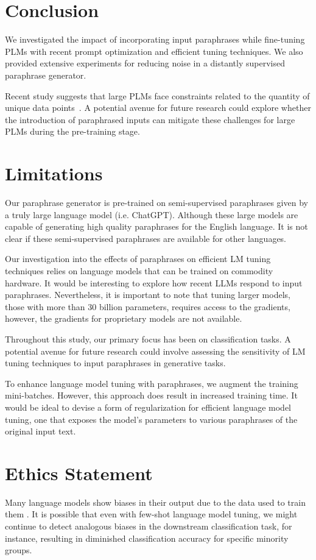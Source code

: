 \documentclass[11pt]{article}
\begin{document}
\section{Conclusion}
We investigated the impact of incorporating input paraphrases while fine-tuning PLMs with recent prompt optimization and efficient tuning techniques. We also provided extensive experiments for reducing noise in a distantly supervised paraphrase generator.

Recent study suggests that large PLMs face constraints related to the quantity of unique data points~\cite{muennighoff2023scaling}. A potential avenue for future research could explore whether the introduction of paraphrased inputs can mitigate these challenges for large PLMs during the pre-training stage.

\section*{Limitations}
Our paraphrase generator is pre-trained on semi-supervised paraphrases given by a truly large language model (i.e. ChatGPT). Although these large models are capable of generating high quality paraphrases for the English language. It is not clear if these semi-supervised paraphrases are available for other languages.

Our investigation into the effects of paraphrases on efficient LM tuning techniques relies on language models that can be trained on commodity hardware. It would be interesting to explore how recent LLMs respond to input paraphrases. Nevertheless, it is important to note that tuning larger models, those with more than 30 billion parameters, requires access to the gradients, however, the gradients for proprietary models are not available.

Throughout this study, our primary focus has been on classification tasks. A potential avenue for future research could involve assessing the sensitivity of LM tuning techniques to input paraphrases in generative tasks.

To enhance language model tuning with paraphrases, we augment the training mini-batches. However, this approach does result in increased training time. It would be ideal to devise a form of regularization for efficient language model tuning, one that exposes the model's parameters to various paraphrases of the original input text.

\section*{Ethics Statement}
Many language models show biases in their output due to the data used to train them \cite{liang2021towards}.   It is possible that even with few-shot language model tuning, we might continue to detect analogous biases in the downstream classification task, for instance, resulting in diminished classification accuracy for specific minority groups.
\end{document}
